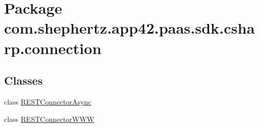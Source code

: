 \hypertarget{namespacecom_1_1shephertz_1_1app42_1_1paas_1_1sdk_1_1csharp_1_1connection}{\section{Package com.\+shephertz.\+app42.\+paas.\+sdk.\+csharp.\+connection}
\label{namespacecom_1_1shephertz_1_1app42_1_1paas_1_1sdk_1_1csharp_1_1connection}
}
\subsection*{Classes}
\begin{DoxyCompactItemize}
\item 
class \hyperlink{classcom_1_1shephertz_1_1app42_1_1paas_1_1sdk_1_1csharp_1_1connection_1_1_r_e_s_t_connector_async}{R\+E\+S\+T\+Connector\+Async}
\item 
class \hyperlink{classcom_1_1shephertz_1_1app42_1_1paas_1_1sdk_1_1csharp_1_1connection_1_1_r_e_s_t_connector_w_w_w}{R\+E\+S\+T\+Connector\+W\+W\+W}
\end{DoxyCompactItemize}
